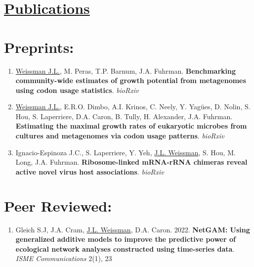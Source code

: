 \documentclass[]{res}
\begin{document}
\begin{resume}
\begin{itemize}[leftmargin=*]
\end{itemize} 

 
 \section{\underline{Publications}} \vspace{2mm}
 
 
 \section{Preprints:} \vspace{0mm}
  
 \begin{enumerate}[leftmargin=*]
 \setlength\itemsep{0.25em}
 
 \item \underline{Weissman J.L.}, M. Peras, T.P. Barnum, J.A. Fuhrman. {\bf Benchmarking community-wide estimates of growth potential from metagenomes using codon usage statistics}. \emph{bioRxiv}

\item \underline{Weissman J.L.}, E.R.O. Dimbo, A.I. Krinos, C. Neely, Y. Yag\"{ues}, D. Nolin, S. Hou, S. Laperriere, D.A. Caron, B. Tully, H. Alexander, J.A. Fuhrman. {\bf Estimating the maximal growth rates of eukaryotic microbes from cultures and metagenomes via codon usage patterns}. \emph{bioRxiv}

\item Ignacio-Espinoza J.C., S. Laperriere, Y. Yeh, \underline{J.L. Weissman}, S. Hou, M. Long, J.A. Fuhrman. {\bf Ribosome-linked mRNA-rRNA chimeras reveal active novel virus host associations}. \emph{bioRxiv}

  \end{enumerate} 
  

  
 \section{Peer Reviewed:} \vspace{0mm}
 
\begin{enumerate}[leftmargin=*]
 \setlength\itemsep{0.25em}
 
 \item Gleich S.J, J.A. Cram, \underline{J.L. Weissman}, D.A. Caron. 2022. {\bf NetGAM: Using generalized additive models to improve the predictive power of ecological network analyses constructed using time-series data}. \emph{ISME Communications} 2(1), 23
 

\end{enumerate}
\end{resume}
\end{document}
